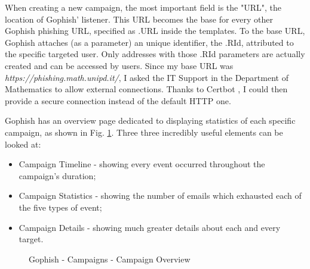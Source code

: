 \documentclass[a4paper]{article}
\begin{document}
\noindent
When creating a new campaign, the most important field is the "URL", the location of Gophish' listener. This URL becomes the base for every other Gophish phishing URL, specified as {{.URL}} inside the templates. To the base URL, Gophish attaches (as a parameter) an unique identifier, the {{.RId}}, attributed to the specific targeted user. Only addresses with those {{.RId}} parameters are actually created and can be accessed by users. Since my base URL was \textit{https://phishing.math.unipd.it/}, I asked the IT Support in the Department of Mathematics to allow external connections. Thanks to Certbot \cite{tools-certbot}, I could then provide a secure connection instead of the default HTTP one.

\newpage

\noindent
Gophish has an overview page dedicated to displaying statistics of each specific campaign, as shown in Fig. \ref{gop-cco}. Three three incredibly useful elements can be looked at:

\begin{itemize}
    \item Campaign Timeline - showing every event occurred throughout the campaign's duration;
    \item Campaign Statistics - showing the number of emails which exhausted each of the five types of event;
    \item Campaign Details - showing much greater details about each and every target.
\end{itemize}

\begin{figure}[H]
	\centering
	\caption{Gophish - Campaigns - Campaign Overview}
	\label{gop-cco}
\end{figure}
\end{document}
